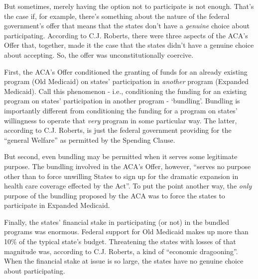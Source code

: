 \documentclass[
  11pt,
  letterpaper,
  DIV=11,
  numbers=noendperiod,
  oneside]{scrartcl}
\begin{document}
But sometimes, merely having the option not to participate is not
enough. That's the case if, for example, there's something about the
nature of the federal government's offer that means that the states
don't have a \emph{genuine} choice about participating. According to
C.J. Roberts, there were three aspects of the ACA's Offer that,
together, made it the case that the states didn't have a genuine choice
about accepting. So, the offer was unconstitutionally coercive.

First, the ACA's Offer conditioned the granting of funds for an already
existing program (Old Medicaid) on states' participation in
\emph{another} program (Expanded Medicaid). Call this phenomenon - i.e.,
conditioning the funding for an existing program on states'
participation in another program - `bundling'. Bundling is importantly
different from conditioning the funding for a program on states'
willingness to operate that \emph{very} program in some particular way.
The latter, according to C.J. Roberts, is just the federal government
providing for the ``general Welfare'' as permitted by the Spending
Clause.

But second, even bundling may be permitted when it serves some
legitimate purpose. The bundling involved in the ACA's Offer, however,
``serves no purpose other than to force unwilling States to sign up for
the dramatic expansion in health care coverage effected by the
Act''. To put the point another way, the
\emph{only} purpose of the bundling proposed by the ACA was to force the
states to participate in Expanded Medicaid.

Finally, the states' financial stake in participating (or not) in the
bundled programs was enormous. Federal support for Old Medicaid makes up
more than 10\% of the typical state's budget. Threatening the states
with losses of that magnitude was, according to C.J. Roberts, a kind of
``economic dragooning''. When the financial
stake at issue is so large, the states have no genuine choice about
participating.
\end{document}
